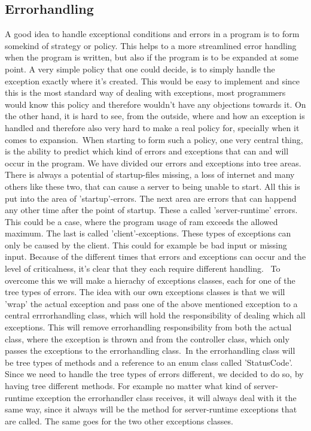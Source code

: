 \documentclass[a4paper,10pt,titlepage]{article}
\begin{document}
\subsection{Errorhandling}
			A good idea to handle exceptional conditions and errors in a program is to form somekind of strategy or policy. This helps to a more streamlined error handling
			when the program is written, but also if the program is to be expanded at some point. A very simple policy that one could decide, is to
			simply handle the exception exactly where it's created. This would be easy to implement and since this is the most standard way of dealing with
			exceptions, most programmers would know this policy and therefore wouldn't have any objections towards it. On the other hand, it is hard to see, from
			the outside, where and how an exception is handled and therefore also very hard to make a real policy for, specially when it comes to expansion.\
			When starting to form such a policy, one very central thing, is the ability to predict which kind of errors and exceptions that can and will 
			occur in the program. We have divided our errors and exceptions into tree areas. There is always a potential of startup-files missing, a loss of internet and many others like these two, that can cause a server to being unable to start. All this is put into the area of 'startup'-errors. The next area are errors that can happend any other time after the point of startup. These a called 'server-runtime' errors. This could be a case, where the program usage of ram exceeds the allowed maximum. The last is called 'client'-exceptions. These types of exceptions can only be caused by the client. This could for example be bad input or missing input.  Because of the different times that errors and exceptions can occur and the level of criticalness, it's clear that they each require different handling. \
			To overcome this we will make a hierachy of exceptions classes, each for one of the tree types of errors. The idea with our own exceptions classes is that we will 'wrap' the actual exception and pass one of the above mentioned exception to a central errrorhandling class, which will hold the responsibility of dealing which all exceptions. This will remove errorhandling responsibility from both the actual class, where the exception is thrown and from the controller class, which only passes the exceptions to the errorhandling class.\
			In the errorhandling class will be tree types of methods and a reference to an enum class called 'StatusCode'. Since we need to handle the tree types of errors different, we decided to do so, by having tree different methods. For example no matter what kind of server-runtime exception the errorhandler class receives, it will always deal with it the same way, since it always will be the method for server-runtime exceptions that are called. The same goes for the two other exceptions classes.\
\end{document}
